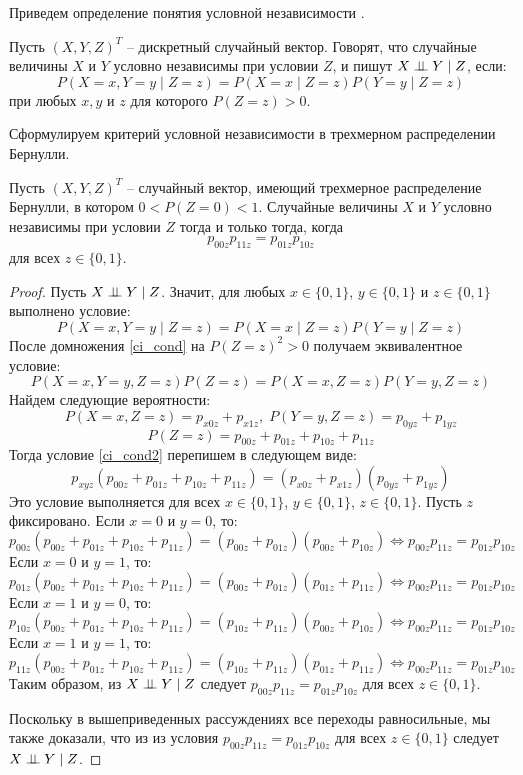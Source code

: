 Приведем определение понятия условной независимости \cite{Lauritzen1996}.
\begin{definition}\label{cond_ind_def}
    Пусть $(X,Y,Z)^T$ -- дискретный случайный вектор.
    Говорят, что случайные величины $X$ и $Y$ условно независимы при условии $Z$,
    и пишут $X \perp\!\!\!\perp Y \mid Z$, если:
    $$
    P(X=x, Y=y \mid Z = z) = P(X=x \mid Z = z) P(Y=y \mid Z = z)
    $$
    при любых $x,y$ и $z$ для которого $P(Z=z)>0$.
\end{definition}
Сформулируем критерий условной независимости в трехмерном
распределении Бернулли.
\begin{theorem}\label{thm1}
    Пусть $(X,Y,Z)^T$ -- случайный вектор, имеющий трехмерное распределение Бернулли, в котором $0<P(Z=0)<1$.
    Случайные величины $X$ и $Y$ условно независимы при условии $Z$ тогда и только тогда, когда
    $$p_{00z}p_{11z}=p_{01z}p_{10z}$$ для всех $z\in \{0,1\}$.
\end{theorem}
\begin{proof}
    Пусть $X \perp\!\!\!\perp Y \mid Z$. Значит, для любых $x\in \{0,1\}$, $y\in \{0,1\}$ и $z\in \{0,1\}$ выполнено условие:
    \begin{equation}\label{ci_cond}
        P(X=x, Y=y \mid Z = z) = P(X=x \mid Z = z) P(Y=y \mid Z = z)
    \end{equation}
    После домножения \eqref{ci_cond} на $P(Z=z)^2>0$ получаем эквивалентное условие:
    \begin{equation}\label{ci_cond2}
        P(X=x,Y=y,Z=z)P(Z=z)=P(X=x,Z=z)P(Y=y,Z=z)
    \end{equation}
    Найдем следующие вероятности:
    $$
        P(X=x, Z=z) = p_{x0z} + p_{x1z},\;  P(Y=y, Z=z) = p_{0yz} + p_{1yz}
    $$
    $$
        P(Z=z)= p_{00z} + p_{01z} + p_{10z} + p_{11z}
    $$
    Тогда условие \eqref{ci_cond2} перепишем в следующем виде:
    $$
        p_{xyz} (p_{00z} + p_{01z} + p_{10z} + p_{11z}) = (p_{x0z} + p_{x1z}) (p_{0yz} + p_{1yz})
    $$
    Это условие выполняется для всех $x \in \{0,1\}$, $y\in \{0,1\}$, $z\in \{0,1\}$.
    Пусть $z$ фиксировано.
    Если $x=0$ и $y=0$, то:
    $$
        p_{00z} (p_{00z} + p_{01z} + p_{10z} + p_{11z}) = (p_{00z} + p_{01z}) (p_{00z} + p_{10z})
    \Leftrightarrow
        p_{00z} p_{11z} = p_{01z} p_{10z}
    $$
    Если $x=0$ и $y=1$, то:
    $$
        p_{01z} (p_{00z} + p_{01z} + p_{10z} + p_{11z}) = (p_{00z} + p_{01z}) (p_{01z} + p_{11z})
    \Leftrightarrow
    p_{00z} p_{11z} = p_{01z} p_{10z}
    $$
    Если $x=1$ и $y=0$, то:
    $$
        p_{10z} (p_{00z} + p_{01z} + p_{10z} + p_{11z}) = (p_{10z} + p_{11z}) (p_{00z} + p_{10z})
    \Leftrightarrow
    p_{00z} p_{11z} = p_{01z} p_{10z}
    $$
    Если $x=1$ и $y=1$, то:
    $$
        p_{11z} (p_{00z} + p_{01z} + p_{10z} + p_{11z}) = (p_{10z} + p_{11z}) (p_{01z} + p_{11z})
    \Leftrightarrow
    p_{00z} p_{11z} = p_{01z} p_{10z}
    $$
    Таким образом, из $X \perp\!\!\!\perp Y \mid Z$ следует
    $p_{00z}p_{11z}=p_{01z}p_{10z}$ для всех $z \in \{0,1\}$.

    Поскольку в вышеприведенных рассуждениях все переходы равносильные,
    мы также доказали, что из из условия $p_{00z}p_{11z}=p_{01z}p_{10z}$ для всех $z \in \{0,1\}$
    следует $X \perp\!\!\!\perp Y \mid Z$.
\end{proof}
